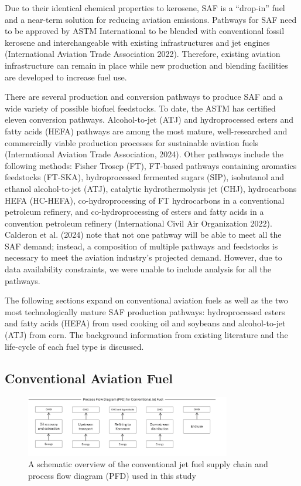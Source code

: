 \documentclass[12pt]{article}
\begin{document}
\begin{Appendix}
Due to their identical chemical properties to kerosene, SAF is a “drop-in” fuel and a near-term solution for reducing aviation emissions. Pathways for SAF need to be approved by ASTM International to be blended with conventional fossil kerosene and interchangeable with existing infrastructures and jet engines (International Aviation Trade Association 2022). Therefore, existing aviation infrastructure can remain in place while new production and blending facilities are developed to increase fuel use. 

There are several production and conversion pathways to produce SAF and a wide variety of possible biofuel feedstocks. To date, the ASTM has certified eleven conversion pathways. Alcohol-to-jet (ATJ) and hydroprocessed esters and fatty acids (HEFA) pathways are among the most mature, well-researched and commercially viable production processes for sustainable aviation fuels (International Aviation Trade Association, 2024). Other pathways include the following methods: Fisher Troscp (FT), FT-based pathways containing aromatics feedstocks (FT-SKA), hydroprocessed fermented sugars (SIP), isobutanol and ethanol alcohol-to-jet (ATJ), catalytic hydrothermolysis jet (CHJ), hydrocarbons HEFA (HC-HEFA), co-hydroprocessing of FT hydrocarbons in a conventional petroleum refinery, and co-hydroprocessing of esters and fatty acids in a convention petroleum refinery (International Civil Air Organization 2022). Calderon et al. (2024) note that not one pathway will be able to meet all the SAF demand; instead, a composition of multiple pathways and feedstocks is necessary to meet the aviation industry’s projected demand. However, due to data availability constraints, we were unable to include analysis for all the pathways. 


The following sections expand on conventional aviation fuels as well as the two most technologically mature SAF production pathways: hydroprocessed esters and fatty acids (HEFA) from used cooking oil and soybeans and alcohol-to-jet (ATJ) from corn. The background information from existing literature and the life-cycle of each fuel type is discussed.


\subsection{Conventional Aviation Fuel }

\begin{figure}[H]
\centering
\includegraphics[width=0.8\textwidth]{Fig 1.png} %
\caption{A schematic overview of the conventional jet fuel supply chain and process flow diagram (PFD) used in this study}
\label{fig:figure 1}
\end{figure}


\end{Appendix}
\end{document}

